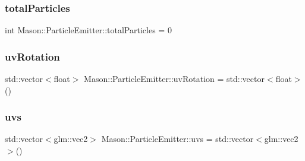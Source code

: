 \hypertarget{class_mason_1_1_particle_emitter_afc99ceabe0f61e289bc7e6d4c3b1b038}{}\label{class_mason_1_1_particle_emitter_afc99ceabe0f61e289bc7e6d4c3b1b038} 
\subsubsection{\texorpdfstring{total\+Particles}{totalParticles}}
{\footnotesize\ttfamily int Mason\+::\+Particle\+Emitter\+::total\+Particles = 0\hspace{0.3cm}{\ttfamily [protected]}}

\hypertarget{class_mason_1_1_particle_emitter_a477934ce692453792d8be3ff51a3d22f}{}\label{class_mason_1_1_particle_emitter_a477934ce692453792d8be3ff51a3d22f} 
\subsubsection{\texorpdfstring{uv\+Rotation}{uvRotation}}
{\footnotesize\ttfamily std\+::vector$<$float$>$ Mason\+::\+Particle\+Emitter\+::uv\+Rotation = std\+::vector$<$float$>$()\hspace{0.3cm}{\ttfamily [protected]}}

\hypertarget{class_mason_1_1_particle_emitter_a6979395fb93878859edace9ab327dcc4}{}\label{class_mason_1_1_particle_emitter_a6979395fb93878859edace9ab327dcc4} 
\subsubsection{\texorpdfstring{uvs}{uvs}}
{\footnotesize\ttfamily std\+::vector$<$glm\+::vec2$>$ Mason\+::\+Particle\+Emitter\+::uvs = std\+::vector$<$glm\+::vec2$>$()\hspace{0.3cm}{\ttfamily [protected]}}

\hypertarget{class_mason_1_1_particle_emitter_a9c2a9f3d9c113d2503598551c992fde4}{}\label{class_mason_1_1_particle_emitter_a9c2a9f3d9c113d2503598551c992fde4} 
